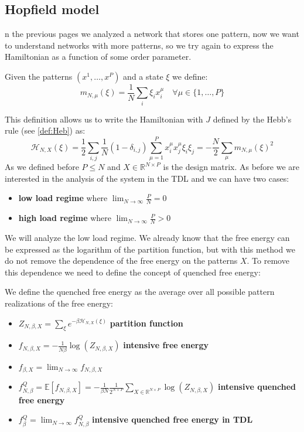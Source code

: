 \subsection{Hopfield model}
n the previous pages we analyzed a network that stores one pattern, now we want to understand networks with more patterns, so we try again to express the Hamiltonian as a function of some order parameter.
\begin{definition} \label{def:mattis_mgn}
Given the patterns $(x^1,\ldots,x^P)$ and a state $\xi$ we define:
\[
    m_{N,\mu}(\xi) = \frac{1}{N} \sum_i  \xi_i x^\mu_i \quad \forall \mu \in \{1,\ldots,P\}
\]
\end{definition}
This definition allows us to write the Hamiltonian with $J$ defined by the Hebb's rule (see \cref{def:Heb}) as:
\[
    \mathcal{H}_{N,X}(\xi)  = \frac12 \sum_{i,j} \frac1N (1 - \delta_{i,j}) \sum_{\mu=1}^P x^{\mu}_i x^{\mu}_j \xi_i \xi_j =
    -\frac{N}{2} \sum_\mu  m_{N,\mu}(\xi)^2
\]
As we defined before $P \leq N$ and $X \in \mathbb{R}^{N \times P}$ is the design matrix. As before we are interested in the analysis of the system in the TDL and we can have two cases:
\begin{itemize}
    \item \textbf{low load regime} where $\lim_{N\to\infty} \frac{P}{N} = 0$
    \item \textbf{high load regime} where $\lim_{N\to\infty} \frac{P}{N} > 0$
\end{itemize}
We will analyze the low load regime. We already know that the free energy can be expressed as the logarithm of the partition function, but with this method we do not remove the dependence of the free energy on the patterns $X$. To remove this dependence we need to define the concept of quenched free energy:
\begin{definition}
We define the quenched free energy as the average over all possible pattern realizations of the free energy:
\begin{itemize}
    \item $Z_{N,\beta,X} = \sum_\xi e^{-\beta\mathcal{H}_{N,X}\left(\xi\right)}$ \textbf{partition function}
    \item $f_{N,\beta,X} = -\frac{1}{N\beta}\log\left(Z_{N,\beta,X}\right)$ \textbf{intensive free energy}
    \item $f_{\beta,X} = \lim_{N\to\infty} f_{N,\beta,X}$
    \item $f^Q_{N,\beta} = \mathbb{E}\left[f_{N,\beta,X}\right] = -\frac{1}{\beta N} \frac{1}{2^{N\times P}}\sum_{X \in \mathbb{R}^{N \times P}}\log( Z_{N,\beta,X}) $
    \quad \textbf{intensive quenched free energy}
    \item $f^Q_{\beta}= \lim_{N \to \infty} f^Q_{N,\beta}  $ \quad \textbf{intensive quenched free energy in TDL}
\end{itemize}
\end{definition}
